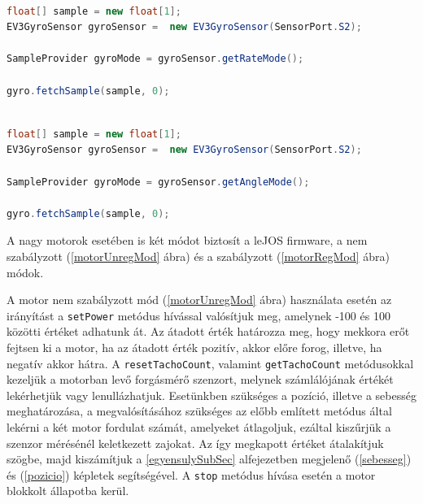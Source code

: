\begin{lstlisting}[label=gyroRateMod, caption= Giroszkóp szenzor \texttt{rate} mód használata, language=Java]

float[] sample = new float[1];
EV3GyroSensor gyroSensor =  new EV3GyroSensor(SensorPort.S2);

SampleProvider gyroMode = gyroSensor.getRateMode();

gyro.fetchSample(sample, 0);

\end{lstlisting}

\begin{lstlisting}[label=gyroAngleMod, caption= Giroszkóp szenzor \texttt{angle} mód használata, language=Java]

float[] sample = new float[1];
EV3GyroSensor gyroSensor =  new EV3GyroSensor(SensorPort.S2);

SampleProvider gyroMode = gyroSensor.getAngleMode();

gyro.fetchSample(sample, 0);

\end{lstlisting}

A nagy motorok esetében is két módot biztosít a leJOS firmware, a nem szabályzott (\ref{motorUnregMod} ábra) és a szabályzott (\ref{motorRegMod} ábra) módok.

A motor nem szabályzott mód (\ref{motorUnregMod} ábra) használata esetén az irányítást a \texttt{setPower} metódus hívással valósítjuk meg, amelynek -100 és 100 közötti értéket adhatunk át. Az átadott érték határozza meg, hogy mekkora erőt fejtsen ki a motor, ha az átadott érték pozitív, akkor előre forog, illetve, ha negatív akkor hátra. A \texttt{resetTachoCount}, valamint \texttt{getTachoCount} metódusokkal kezeljük a motorban levő forgásmérő szenzort, melynek számlálójának értékét lekérhetjük vagy lenullázhatjuk. Esetünkben szükséges a pozíció, illetve a sebesség meghatározása, a megvalósításához szükséges az előbb említett metódus által lekérni a két motor fordulat számát, amelyeket átlagoljuk, ezáltal kiszűrjük a szenzor mérésénél keletkezett zajokat. Az így megkapott értéket átalakítjuk szögbe, majd kiszámítjuk a \ref{egyensulySubSec} alfejezetben megjelenő (\ref{sebesseg}) és (\ref{pozicio}) képletek segítségével. A \texttt{stop} metódus hívása esetén a motor blokkolt állapotba kerül.    

